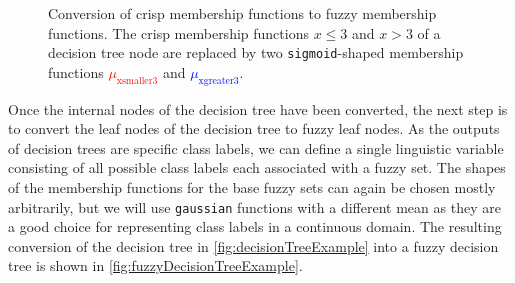 \begin{figure}[H]
    \centering
    \caption[Conversion of crisp tree node into fuzzy tree node]{Conversion of crisp membership functions to fuzzy membership functions. The crisp membership functions $x \leq 3$ and $x>3$ of a decision tree node are replaced by two \texttt{sigmoid}-shaped membership functions \textcolor{red}{$\mu_{\text{xsmaller3}}$} and \textcolor{blue}{$\mu_{\text{xgreater3}}$}.}
    \label{fig:fuzzyMembershipFunctions}
\end{figure}

Once the internal nodes of the decision tree have been converted, the next step is to convert the leaf nodes of the decision tree to fuzzy leaf nodes. As the outputs of decision trees are specific class labels, we can define a single linguistic variable consisting of all possible class labels each associated with a fuzzy set. The shapes of the membership functions for the base fuzzy sets can again be chosen mostly arbitrarily, but we will use \texttt{gaussian} functions with a different mean as they are a good choice for representing class labels in a continuous domain.
The resulting conversion of the decision tree in \autoref{fig:decisionTreeExample} into a fuzzy decision tree is shown in \autoref{fig:fuzzyDecisionTreeExample}.


